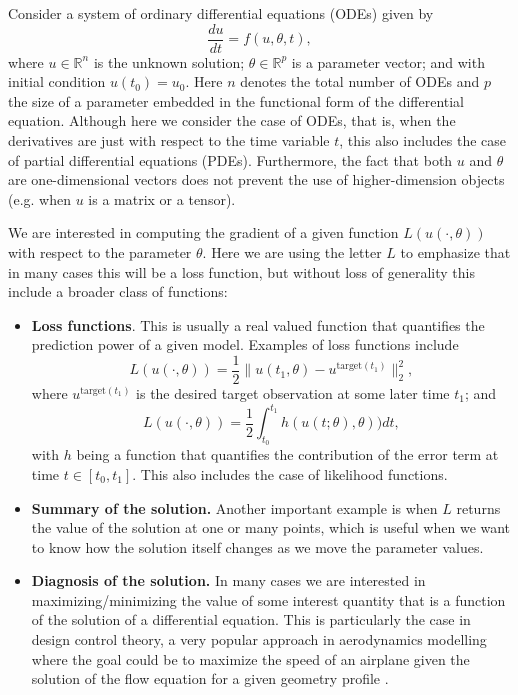 Consider a system of ordinary differential equations (ODEs) given by
\begin{equation}
 \frac{du}{dt} = f(u, \theta, t),
 \label{eq:original_ODE}
\end{equation}
where $u \in \mathbb{R}^n$ is the unknown solution; $\theta \in \mathbb R^p$ is a parameter vector; and with initial condition $u(t_0) = u_0$.
Here $n$ denotes the total number of ODEs and $p$ the size of a parameter embedded in the functional form of the differential equation.
Although here we consider the case of ODEs, that is, when the derivatives are just with respect to the time variable $t$, this also includes the case of partial differential equations (PDEs).
Furthermore, the fact that both $u$ and $\theta$ are one-dimensional vectors does not prevent the use of higher-dimension objects (e.g. when $u$ is a matrix or a tensor). 

We are interested in computing the gradient of a given function $L(u(\cdot, \theta))$ with respect to the parameter $\theta$.
Here we are using the letter $L$ to emphasize that in many cases this will be a loss function, but without loss of generality this include a broader class of functions: 
\begin{itemize}
    \item \textbf{Loss functions}. This is usually a real valued function that quantifies the prediction power of a given model. Examples of loss functions include
    \begin{equation}
     L(u(\cdot, \theta)) = \frac{1}{2} \| u(t_1, \theta) - u^{\text{target}(t_1)} \|_2^2,
     \label{eq:quadratic-loss-function}
    \end{equation}
    where $u^{\text{target}(t_1)}$ is the desired target observation at some later time $t_1$; and
    \begin{equation}
     L(u(\cdot, \theta)) = \frac{1}{2} \int_{t_0}^{t_1} h( u(t;\theta), \theta) ) dt, 
    \end{equation}
    with $h$ being a function that quantifies the contribution of the error term at time $t \in [t_0, t_1]$. This also includes the case of likelihood functions.  
    \item \textbf{Summary of the solution.} Another important example is when $L$ returns the value of the solution at one or many points, which is useful when we want to know how the solution itself changes as we move the parameter values. 
    \item \textbf{Diagnosis of the solution.} In many cases we are interested in maximizing/minimizing the value of some interest quantity that is a function of the solution of a differential equation. This is particularly the case in design control theory, a very popular approach in aerodynamics modelling where the goal could be to maximize the speed of an airplane given the solution of the flow equation for a given geometry profile \cite{Jameson_1988}. 
\end{itemize}

